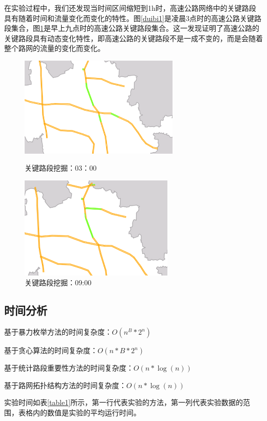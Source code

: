				在实验过程中，我们还发现当时间区间缩短到1h时，高速公路网络中的关键路段具有随着时间和流量变化而变化的特性。图\ref{duibi1}是凌晨3点时的高速公路关键路段集合，图\ref{duibi2}是早上九点时的高速公路关键路段集合。这一发现证明了高速公路的关键路段具有动态变化特性，即高速公路的关键路段不是一成不变的，而是会随着整个路网的流量的变化而变化。


				\begin{figure}[h]
				\begin{minipage}{0.5\linewidth}
					\centering
					\includegraphics[width=3.0in]{picture/duibi1}
					\caption{关键路段挖掘：03：00}
					\label{duibi1}
				\end{minipage}%
				\begin{minipage}{0.5\linewidth}
					\centering
					\includegraphics[width=2.9in]{picture/duibi2}
					\caption{关键路段挖掘：09:00}
					\label{duibi2}
				\end{minipage}
				\end{figure}

			\subsection{时间分析}
				基于暴力枚举方法的时间复杂度：$O({n^B}*{2^n})$

				基于贪心算法的时间复杂度：$O(n*B*{2^n})$

				基于统计路段重要性方法的时间复杂度：$O(n*\log (n))$

				基于路网拓扑结构方法的时间复杂度：$O(n*\log (n))$

				实验时间如表\ref{table1}所示，第一行代表实验的方法，第一列代表实验数据的范围，表格内的数值是实验的平均运行时间。

